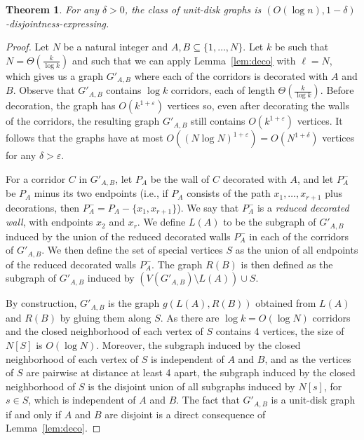 \documentclass[a4paper,reqno, 12pt]{amsart}
\newtheorem{theorem}{Theorem}[section]
\begin{document}
\begin{theorem}\label{thm:udg}
  For any $\delta>0$, the class of unit-disk graphs is
  $(O(\log n),1-\delta)$-disjointness-expressing.
\end{theorem}
\begin{proof}
Let $N$ be a natural integer and $A,B\subseteq\{1, \ldots, N\}$. 
Let $k$ be such that $N=\Theta \left
  (\tfrac{k}{\log k} \right )$ and such that  we can apply Lemma~\ref{lem:deco} with $\ell=N$, which gives us a graph $G'_{A,B}$ where each of the corridors is decorated with $A$ and $B$. 
  Observe that $G'_{A,B}$ contains $\log k$ corridors, each
of length $\Theta\left (\tfrac{k}{\log k} \right)$. Before decoration, the graph has  $O(k^{1+\varepsilon})$ vertices so, even after decorating the walls
of the corridors, the resulting graph $G'_{A,B}$ still contains
$O\left (k^{1+\varepsilon} \right)$ vertices. It follows that the graphs have at most $O((N\log
N)^{1+\varepsilon})=O(N^{1+\delta})$ vertices for any
$\delta>\varepsilon$.

For a corridor $C$ in $G'_{A,B}$, let $P_A$ be the wall of $C$
decorated with $A$, and let $P_A^-$ be $P_A$ minus its two endpoints
(i.e., if $P_A$ consists of the path $x_1,\ldots,x_{r+1}$ plus 
decorations, then $P_A^-=P_A-\{x_1,x_{r+1}\}$). We say that $P_A^-$ is
a \emph{reduced decorated wall}, with endpoints $x_2$ and $x_r$.
We define $L(A)$ to be the subgraph of  $G'_{A,B}$ induced by the
union of the reduced decorated walls $P_A^-$ in each of the corridors
of $G'_{A,B}$. We then define the set of special vertices $S$ as the
union of all endpoints of the reduced decorated walls $P_A^-$. The
graph $R(B)$ is then defined as the subgraph of $G'_{A,B}$ induced by
$(V(G'_{A,B})\setminus L(A))\cup S$.

By construction,
$G'_{A,B}$ is the graph $g(L(A), R(B))$ obtained from $L(A)$ and $R(B)$
by gluing them along $S$.
As there are $\log k=O(\log N)$ corridors and the closed neighborhood
of each vertex of $S$ contains 4 vertices, the size
of $N[S]$ is  $O(\log N)$. Moreover, the subgraph induced by the
closed neighborhood of each vertex of $S$ is independent of $A$ and
$B$, and as the vertices of $S$ are pairwise at distance at least 4
apart, the subgraph induced by the closed neighborhood of $S$ is the
disjoint union of all subgraphs induced by $N[s]$, for $s\in S$, which is independent of $A$
and $B$.
The fact that $G'_{A,B}$ is a unit-disk graph if and only if $A$ and $B$ are disjoint is a direct consequence of Lemma~\ref{lem:deco}.
\end{proof}
\end{document}
